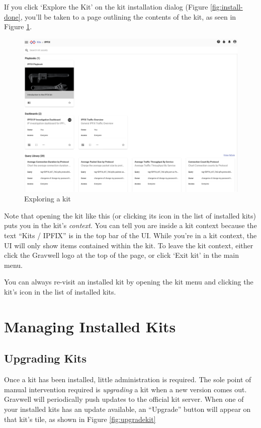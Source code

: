 If you click `Explore the Kit' on the kit installation dialog (Figure \ref{fig:install-done}, you'll be taken to a page outlining the contents of the kit, as seen in Figure \ref{fig:explore}.

\begin{figure}[H]
	\includegraphics[width=0.8\linewidth]{images/explore.png}
	\caption{Exploring a kit}
	\label{fig:explore}
\end{figure}

 Note that opening the kit like this (or clicking its icon in the list of installed kits) puts you in the kit's \emph{context}. You can tell you are inside a kit context because the text ``Kits / IPFIX'' is in the top bar of the UI. While you're in a kit context, the UI will only show items contained within the kit. To leave the kit context, either click the Gravwell logo at the top of the page, or click `Exit kit' in the main menu.

You can always re-visit an installed kit by opening the kit menu and clicking the kit's icon in the list of installed kits.

\section{Managing Installed Kits}

\subsection{Upgrading Kits}

Once a kit has been installed, little administration is required. The sole point of manual intervention required is \emph{upgrading} a kit when a new version comes out. Gravwell will periodically push updates to the official kit server. When one of your installed kits has an update available, an ``Upgrade'' button will appear on that kit's tile, as shown in Figure \ref{fig:upgradekit}

